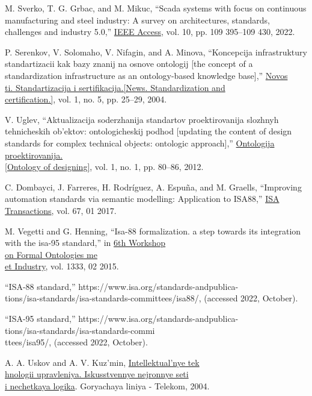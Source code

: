 \documentclass[twocolumn]{scndocument}
\begin{document}
\begin{enumerate}[label=\textbf{[\arabic*]}]
{\item  M. Sverko, T. G. Grbac, and M. Mikuc, “Scada systems with
focus on continuous manufacturing and steel industry: A survey
on architectures, standards, challenges and industry 5.0,” \underline{IEEE
Access}, vol. 10, pp. 109 395–109 430, 2022.
\item  P. Serenkov, V. Solomaho, V. Nifagin, and A. Minova, “Koncepcija infrastruktury standartizacii kak bazy znanij na osnove
ontologij [the concept of a standardization infrastructure as
an ontology-based knowledge base],” \underline{Novos} \\ \underline{ti. Standartizacija i sertifikacija.[News. Standardization and} \\ \underline{ certification.]}, vol. 1,
no. 5, pp. 25–29, 2004.
\item  V. Uglev, “Aktualizacija soderzhanija standartov proektirovanija
slozhnyh tehnicheskih ob’ektov: ontologicheskij podhod [updating the content of design standards for complex technical objects:
ontologic approach],” \underline{Ontologija proektirovanija.} \\ \underline{[Ontology of
designing]}, vol. 1, no. 1, pp. 80–86, 2012.
\item  C. Dombayci, J. Farreres, H. Rodríguez, A. Espuña, and
M. Graells, “Improving automation standards via semantic modelling: Application to ISA88,” \underline{ISA Transactions}, vol. 67, 01 2017.
\item  M. Vegetti and G. Henning, “Isa-88 formalization. a step towards
its integration with the isa-95 standard,” in \underline{6th Workshop} \\ \underline{on
Formal Ontologies me} \\ \underline{et Industry}, vol. 1333, 02 2015.
\item  “ISA-88 standard,” https://www.isa.org/standards-andpublica- \\tions/isa-standards/isa-standards-committees/isa88/,
(accessed 2022, October).
\item  “ISA-95 standard,” https://www.isa.org/standards-andpublica- \\ tions/isa-standards/isa-standards-commi \\ ttees/isa95/,
(accessed 2022, October).
\item  A. A. Uskov and A. V. Kuz’min, \underline{Intellektual’nye tek} \\ \underline{hnologii
upravleniya. Iskusstvennye nejronnye seti} \\ \underline{i nechetkaya logika}.
Goryachaya liniya - Telekom, 2004.
}
\end{enumerate}
\end{document}
